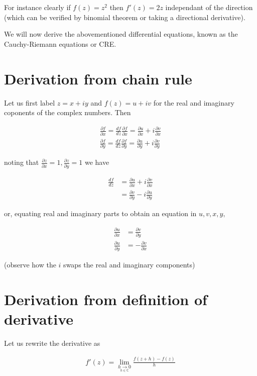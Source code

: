 \documentclass{article}
\begin{document}
For instance clearly if $f(z) = z^2$ then $f'(z) = 2z$ independant of the direction (which can be verified by binomial theorem or taking a directional derivative).

We will now derive the abovementioned differential equations, known as the Cauchy-Riemann equations or CRE.

\section{Derivation from chain rule}

Let us first label $z=x+iy$ and $f(z) = u+iv$ for the real and imaginary coponents of the complex numbers. Then

\begin{align}
\frac{\partial f}{\partial x} = \frac{df}{dz}\frac{\partial f}{\partial x} = \frac{\partial u}{\partial x} + i\frac{\partial v}{\partial x} \\
\frac{\partial f}{\partial y} = \frac{df}{dz}\frac{\partial f}{\partial y} = \frac{\partial u}{\partial y} + i\frac{\partial v}{\partial y} 
\end{align}

noting that $\frac{\partial z}{\partial x} = 1, \frac{\partial z}{\partial y} = 1$ we have

\begin{align}
\frac{df}{dz} &= \frac{\partial u}{\partial x} + i\frac{\partial v}{\partial x}\\
              &= \frac{\partial v}{\partial y} - i\frac{\partial u}{\partial y}
\end{align}

or, equating real and imaginary parts to obtain an equation in $u,v,x,y,$

\begin{align}
\frac{\partial u}{\partial x} &= \frac{\partial v}{\partial y} \\
\frac{\partial u}{\partial y} &=-\frac{\partial v}{\partial x}
\end{align}

(observe how the $i$ swaps the real and imaginary components)

\section{Derivation from definition of derivative}

Let us rewrite the derivative as

\begin{align}
f'(z) = \lim_{\underset{h\in\mathbb{C}}{h\to 0}} \frac{f(z+h) - f(z)}{h}
\end{align}
\end{document}
